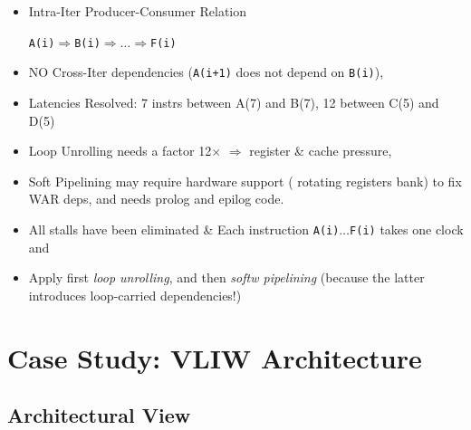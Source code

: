 \documentclass{beamer}
\renewcommand{\emph}[1]{\textcolor{structure}{#1}}
\newcommand{\emp}[1]{\textcolor{DikuRed}{ #1}}
\begin{document}
\begin{frame}[fragile,t]
\begin{scriptsize}
\begin{itemize}
\item Intra-Iter Producer-Consumer Relation 
\begin{scriptsize}{\tt A(i)$\Rightarrow$B(i)$\Rightarrow\ldots \Rightarrow$F(i)}\end{scriptsize}
\item NO Cross-Iter dependencies ({\tt A(i+1)} does not depend on {\tt B(i)}),
\item \emph{Latencies Resolved: 7 instrs between A(7) and B(7), 12 between C(5) and D(5)} \pause
\item Loop Unrolling needs a factor 12$\times$ $\Rightarrow$ register \& cache pressure,
\item Soft Pipelining may require hardware support (\emp{rotating registers bank}) to fix
        WAR deps, and needs prolog and epilog code.
\item All stalls have been eliminated \& Each instruction {\tt A(i)$\ldots$F(i)} takes one clock and  
\item \emph{Apply first {\em loop unrolling}, and then {\em softw pipelining} 
        (because the latter introduces loop-carried dependencies!)}
\end{itemize}
\end{scriptsize}

\end{frame}



\section{Case Study: VLIW Architecture}

\begin{frame}[fragile]
	\tableofcontents[currentsection]
\end{frame}

\subsection{Architectural View}
\end{document}

